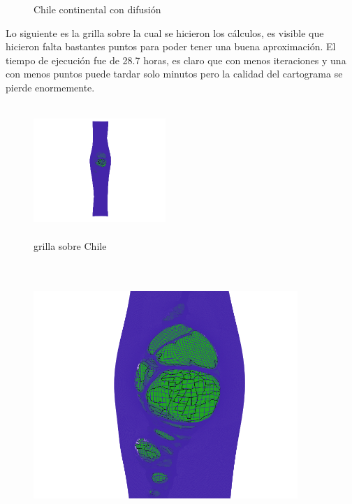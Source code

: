 \documentclass[20pt]{report}
\begin{document}
\begin{itemize}
\begin{figure}[H]
\begin{center}
\caption{Chile continental con difusi\'on}
\label{Label para referencia}
\end{center}
\end{figure}
Lo siguiente es la grilla sobre la cual se hicieron los c\'alculos, es visible que hicieron falta bastantes puntos para poder tener una buena aproximaci\'on. El tiempo de ejecuci\'on fue de 28.7 horas, es claro que con menos iteraciones y una  con menos puntos puede tardar solo minutos pero la calidad del cartograma se pierde enormemente.
\begin{figure}[H]
\begin{center}
\includegraphics[width=5cm, height=5cm]{grilla.png}
\vspace{-0.5cm} %
\caption{grilla sobre Chile}
\label{Label para referencia}
\end{center}
\end{figure}
\begin{figure}[H]
\begin{center}
\includegraphics[width=10cm, height=10cm]{grillacentro.png}
\vspace{-0.5cm} %

\end{center}
\end{figure}
\end{itemize}
\end{document}
